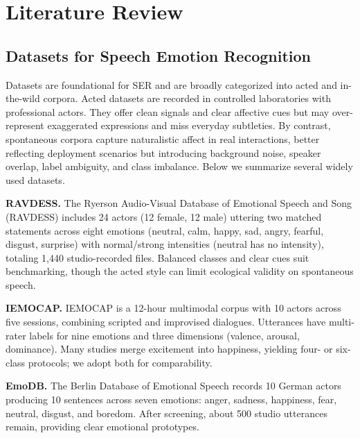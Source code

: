 
\chapter{Literature Review}








\section{Datasets for Speech Emotion Recognition}

Datasets are foundational for SER and are broadly categorized into acted and in-the-wild corpora. Acted datasets are recorded in controlled laboratories with professional actors. They offer clean signals and clear affective cues but may over-represent exaggerated expressions and miss everyday subtleties. By contrast, spontaneous corpora capture naturalistic affect in real interactions, better reflecting deployment scenarios but introducing background noise, speaker overlap, label ambiguity, and class imbalance. Below we summarize several widely used datasets.

\textbf{RAVDESS.} The Ryerson Audio-Visual Database of Emotional Speech and Song (RAVDESS) \cite{livingstone2018ryerson} includes 24 actors (12 female, 12 male) uttering two matched statements across eight emotions (neutral, calm, happy, sad, angry, fearful, disgust, surprise) with normal/strong intensities (neutral has no intensity), totaling 1,440 studio-recorded files. Balanced classes and clear cues suit benchmarking, though the acted style can limit ecological validity on spontaneous speech.

\textbf{IEMOCAP.} IEMOCAP \cite{busso2008iemocap} is a 12-hour multimodal corpus with 10 actors across five sessions, combining scripted and improvised dialogues. Utterances have multi-rater labels for nine emotions and three dimensions (valence, arousal, dominance). Many studies merge excitement into happiness, yielding four- or six-class protocols; we adopt both for comparability.

\textbf{EmoDB.} The Berlin Database of Emotional Speech \cite{burkhardt2005database} records 10 German actors producing 10 sentences across seven emotions: anger, sadness, happiness, fear, neutral, disgust, and boredom. After screening, about 500 studio utterances remain, providing clear emotional prototypes.

